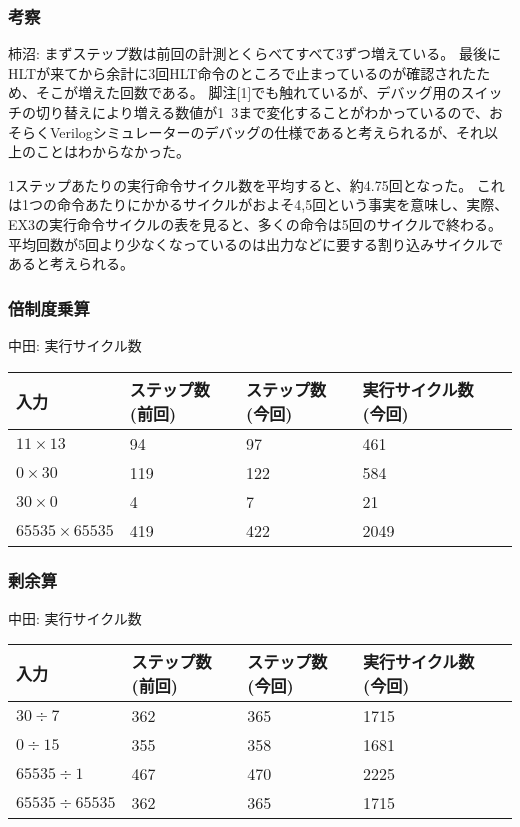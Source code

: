 \documentclass{jsarticle}
\begin{document}
\subsubsection*{考察}
柿沼:
まずステップ数は前回の計測とくらべてすべて3ずつ増えている。
最後にHLTが来てから余計に3回HLT命令のところで止まっているのが確認されたため、そこが増えた回数である。
脚注[1]でも触れているが、デバッグ用のスイッチの切り替えにより増える数値が1~3まで変化することがわかっているので、おそらくVerilogシミュレーターのデバッグの仕様であると考えられるが、それ以上のことはわからなかった。

1ステップあたりの実行命令サイクル数を平均すると、約4.75回となった。
これは1つの命令あたりにかかるサイクルがおよそ4,5回という事実を意味し、実際、EX3の実行命令サイクルの表を見ると、多くの命令は5回のサイクルで終わる。平均回数が5回より少なくなっているのは出力などに要する割り込みサイクルであると考えられる。



\subsubsection*{倍制度乗算}
中田:
実行サイクル数
\begin{table}[h]
  \begin{tabular}{|l|l|l|l|l|} \hline
    入力 & ステップ数(前回) & ステップ数(今回) & 実行サイクル数(今回) \\ \hline
    $11 \times 13$ & 94 & 97 & 461 \\ \hline
    $0 \times 30$ & 119 & 122 & 584 \\ \hline
    $30 \times 0$ & 4 & 7 & 21\\ \hline
    $65535 \times 65535$ & 419 & 422 & 2049 \\ \hline
  \end{tabular}
\end{table}


\subsubsection*{剰余算}
中田:
実行サイクル数
\begin{table}[h]
  \begin{tabular}{|l|l|l|l|l|} \hline
    入力 & ステップ数(前回) & ステップ数(今回) & 実行サイクル数(今回) \\ \hline
    $30 \div 7$ & 362 & 365 & 1715 \\ \hline
    $0 \div 15$ & 355 & 358 & 1681 \\ \hline
    $65535 \div 1$ & 467 & 470 & 2225 \\ \hline
    $65535 \div 65535$ & 362 & 365 & 1715 \\ \hline
  \end{tabular}
\end{table}
\end{document}
